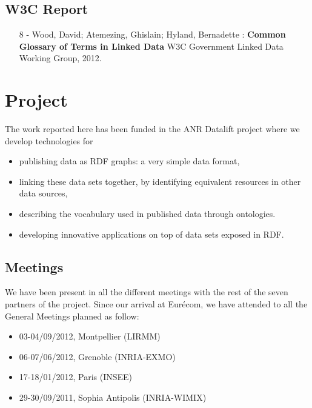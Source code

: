 \documentclass[a4paper,11pt]{report}
\begin{document}
\section*{W3C Report}
\begin{itemize}
\item [8]- Wood, David; Atemezing, Ghislain; Hyland, Bernadette : 
\textbf{Common Glossary of Terms in Linked Data} W3C Government Linked Data Working Group, 2012.
\end{itemize}


\chapter{Project}
The work reported here has been funded in the ANR Datalift project where we develop technologies for
\begin{itemize}
\item publishing data as RDF graphs: a very simple data format, 
\item linking these data sets together, by identifying equivalent resources in other data sources,
\item describing the vocabulary used in published data through ontologies.
\item developing innovative applications on top of data sets exposed in RDF. 
\end{itemize}

\section*{Meetings}
We have been present in all the different meetings with the rest of the seven partners of the project.
Since our arrival at Eur\'{e}com, we have attended to all the General Meetings planned as follow:
\begin{itemize}
\item 03-04/09/2012, Montpellier (LIRMM)
\item 06-07/06/2012, Grenoble (INRIA-EXMO)
\item 17-18/01/2012, Paris (INSEE)
\item 29-30/09/2011, Sophia Antipolis (INRIA-WIMIX)
\end{itemize}
\end{document}
